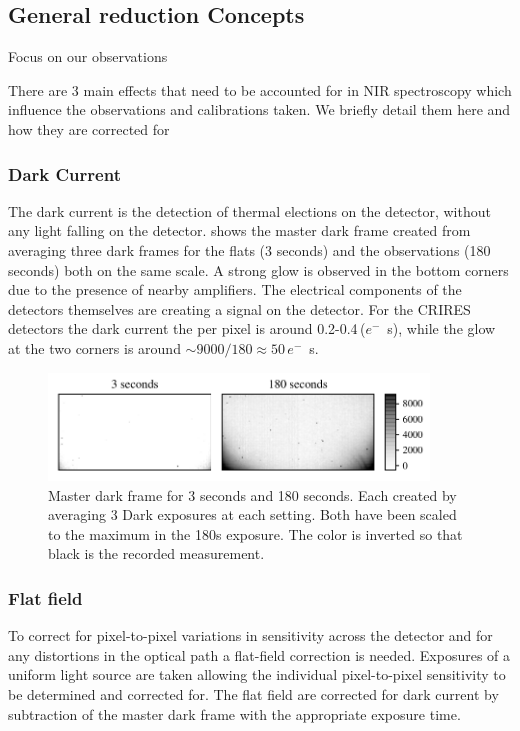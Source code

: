 \subsection{General reduction Concepts}
\label{subsec:nirreduction}

Focus on our observations

There are 3 main effects that need to be accounted for in NIR spectroscopy which influence the observations and calibrations taken. We briefly detail them here and how they are corrected for

\subsubsection{Dark Current}
The dark current is the detection of thermal elections on the detector, without any light falling on the detector.  shows the master dark frame created from averaging three dark frames for the flats (3 seconds) and the observations (180 seconds) both on the same scale. A strong glow is observed in the bottom corners due to the presence of nearby amplifiers. The electrical components of the detectors themselves are creating a signal on the detector.
For the CRIRES detectors the dark current the per pixel is around 0.2-0.4\,(\(e^{-}\)\si{\per\second}), while the glow at the two corners is around \(\sim9000 / 180\approx50\)\,\(e^{-}\)\si{\per\second}.


\begin{figure}[h]
\centering
\includegraphics[width=0.9\textwidth]{figures/reduction/master_darks_1.pdf}
\caption{Master dark frame for 3 seconds and 180 seconds. Each created by averaging 3 Dark exposures at each setting. Both have been scaled to the maximum in the 180s exposure. The color is inverted so that black is the recorded measurement.}
\label{fig:darkcurrent}
\end{figure}


\subsubsection{Flat field}
To correct for pixel-to-pixel variations in sensitivity across the detector and for any distortions in the optical path a flat-field correction is needed. Exposures of a uniform light source are taken allowing the individual pixel-to-pixel sensitivity to be determined and corrected for. The flat field are corrected for dark current by subtraction of the master dark frame with the appropriate exposure time.


